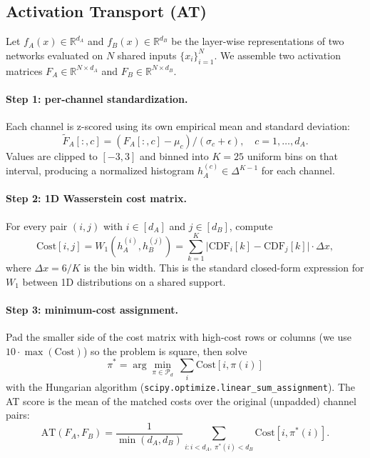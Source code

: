 \documentclass[11pt]{article}
\begin{document}
\subsection{Activation Transport (AT)}

Let $f_A(x) \in \mathbb{R}^{d_A}$ and $f_B(x) \in \mathbb{R}^{d_B}$ be
the layer-wise representations of two networks evaluated on $N$ shared
inputs $\{x_i\}_{i=1}^N$. We assemble two activation matrices
$F_A \in \mathbb{R}^{N \times d_A}$ and $F_B \in \mathbb{R}^{N \times d_B}$.

\paragraph{Step 1: per-channel standardization.} Each channel is
z-scored using its own empirical mean and standard deviation:
\begin{equation}
\tilde{F}_A[:,c] = (F_A[:,c] - \mu_c) / (\sigma_c + \epsilon), \quad
c = 1, \dots, d_A.
\end{equation}
Values are clipped to $[-3, 3]$ and binned into $K=25$ uniform bins on
that interval, producing a normalized histogram $h_A^{(c)} \in \Delta^{K-1}$
for each channel.

\paragraph{Step 2: 1D Wasserstein cost matrix.} For every pair
$(i, j)$ with $i \in [d_A]$ and $j \in [d_B]$, compute
\begin{equation}
\mathrm{Cost}[i, j] = W_1\left(h_A^{(i)}, h_B^{(j)}\right)
= \sum_{k=1}^{K} \big| \mathrm{CDF}_i[k] - \mathrm{CDF}_j[k] \big| \cdot \Delta x,
\end{equation}
where $\Delta x = 6/K$ is the bin width. This is the standard closed-form
expression for $W_1$ between 1D distributions on a shared support.

\paragraph{Step 3: minimum-cost assignment.} Pad the smaller side
of the cost matrix with high-cost rows or columns (we use
$10 \cdot \max(\mathrm{Cost})$) so the problem is square, then solve
\begin{equation}
\pi^* = \arg\min_{\pi \in \mathcal{P}_{d}}\ \sum_{i} \mathrm{Cost}[i, \pi(i)]
\end{equation}
with the Hungarian algorithm
(\texttt{scipy.optimize.linear\_sum\_assignment}). The AT score is the
mean of the matched costs over the original (unpadded) channel pairs:
\begin{equation}
\mathrm{AT}(F_A, F_B) = \frac{1}{\min(d_A, d_B)}
\sum_{i: i < d_A,\ \pi^*(i) < d_B} \mathrm{Cost}[i, \pi^*(i)].
\end{equation}
\end{document}

